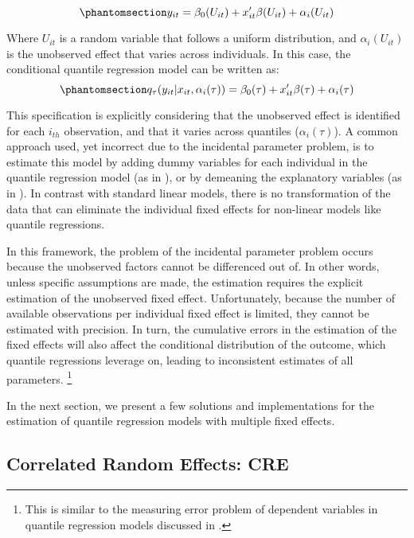\documentclass[bib]{statapress}
\begin{document}
\begin{equation}\phantomsection\label{eq-dgp-panel}{y_{it} = \beta_0(U_{it}) + x_{it}'\beta(U_{it}) + \alpha_i(U_{it})
}\end{equation}

Where \(U_{it}\) is a random variable that follows a uniform
distribution, and \(\alpha_i(U_{it})\) is the unobserved effect that
varies across individuals. In this case, the conditional quantile
regression model can be written as:
\begin{equation}\phantomsection\label{eq-feqr}{q_\tau(y_{it}|x_{it},\alpha_i(\tau))=\beta_0(\tau) + x_{it}'\beta(\tau)+\alpha_i(\tau) 
}\end{equation}

This specification is explicitly considering that the unobserved effect
is identified for each \(i_{th}\) observation, and that it varies across
quantiles (\(\alpha_i(\tau)\)). A common approach used, yet incorrect
due to the incidental parameter problem, is to estimate this model by
adding dummy variables for each individual in the quantile regression
model (as in \citet{budig2001}), or by demeaning the explanatory
variables (as in \citet{budig2010}). In contrast with standard linear
models, there is no transformation of the data that can eliminate the
individual fixed effects for non-linear models like quantile
regressions.

In this framework, the problem of the incidental parameter problem
occurs because the unobserved factors cannot be differenced out of. In
other words, unless specific assumptions are made, the estimation
requires the explicit estimation of the unobserved fixed effect.
Unfortunately, because the number of available observations per
individual fixed effect is limited, they cannot be estimated with
precision. In turn, the cumulative errors in the estimation of the fixed
effects will also affect the conditional distribution of the outcome,
which quantile regressions leverage on, leading to inconsistent
estimates of all parameters. \footnote{This is similar to the measuring
  error problem of dependent variables in quantile regression models
  discussed in \citet{hausman2021}.}

In the next section, we present a few solutions and implementations for
the estimation of quantile regression models with multiple fixed
effects.

\subsection{Correlated Random Effects: CRE}\label{sec-cre}
\end{document}
